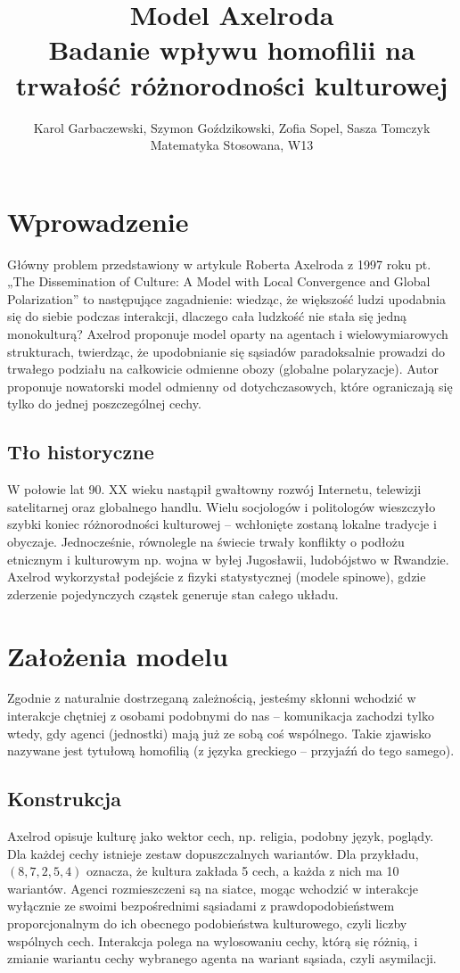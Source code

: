 \documentclass[polish,11pt,a4paper]{article}
\title{
	{\Huge \textbf{Model Axelroda}}\\
	{\LARGE Badanie wpływu homofilii na trwałość różnorodności kulturowej}
	}
\author{
	Karol Garbaczewski, Szymon Goździkowski, Zofia Sopel, Sasza Tomczyk\\
	Matematyka Stosowana, W13
	}
\begin{document}
	\maketitle
	\section{Wprowadzenie}
	Główny problem przedstawiony w artykule Roberta Axelroda 
	z 1997 roku pt. „The Dissemination of Culture: 
	A Model with Local Convergence and Global Polarization”
	to następujące zagadnienie: wiedząc, że większość ludzi upodabnia się do siebie podczas interakcji, 
	dlaczego cała ludzkość nie stała się jedną monokulturą?
	Axelrod proponuje model oparty na agentach i 
	wielowymiarowych strukturach, twierdząc, że upodobnianie się sąsiadów paradoksalnie 
	prowadzi do trwałego podziału na całkowicie odmienne obozy (globalne polaryzacje).
	Autor proponuje nowatorski model odmienny od dotychczasowych, które 
	ograniczają się tylko do jednej poszczególnej cechy.
	\subsection{Tło historyczne}
	W połowie lat 90. XX wieku nastąpił gwałtowny rozwój Internetu, 
	telewizji satelitarnej oraz globalnego handlu.
	Wielu socjologów i politologów wieszczyło szybki
	 koniec różnorodności kulturowej -- wchłonięte zostaną lokalne tradycje i obyczaje.
	Jednocześnie, równolegle na świecie trwały konflikty
	 o podłożu etnicznym i kulturowym np. wojna w byłej Jugosławii, ludobójstwo w Rwandzie.
	Axelrod wykorzystał podejście z fizyki statystycznej (modele spinowe), 
	gdzie zderzenie pojedynczych cząstek generuje stan całego układu.


	\section{Założenia modelu}
	 
	Zgodnie z naturalnie dostrzeganą zależnością,
	jesteśmy skłonni wchodzić w interakcje chętniej z osobami podobnymi do nas 
	-- komunikacja zachodzi tylko wtedy,
	gdy agenci (jednostki) mają już ze sobą coś wspólnego. 
	Takie zjawisko nazywane jest tytułową homofilią
	 (z języka greckiego -- przyjaźń do tego samego).
	\subsection{Konstrukcja}
	Axelrod opisuje kulturę jako
	wektor cech, np. religia, podobny język, poglądy. Dla każdej cechy istnieje zestaw dopuszczalnych wariantów.
	Dla przykładu, \( (8, 7, 2, 5, 4) \) oznacza, że kultura zakłada 5 cech, a każda z nich ma 10 wariantów.
	Agenci  rozmieszczeni są na siatce, mogąc wchodzić w interakcje
	wyłącznie ze swoimi bezpośrednimi sąsiadami z prawdopodobieństwem 
	proporcjonalnym do ich obecnego podobieństwa kulturowego, czyli liczby wspólnych cech. 
	Interakcja polega na wylosowaniu cechy, którą się różnią, 
	i zmianie wariantu cechy wybranego agenta na wariant sąsiada, czyli asymilacji.
\end{document}

